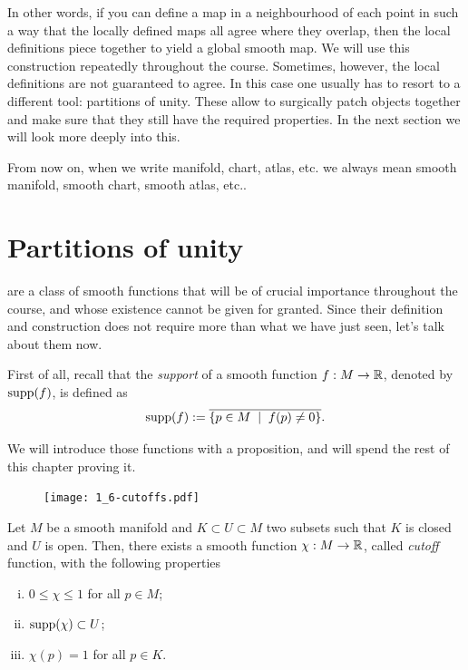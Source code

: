 In other words, if you can define a map in a neighbourhood of each point in such a way that the locally defined maps all agree where they overlap, then the local definitions piece together to yield a global smooth map.
We will use this construction repeatedly throughout the course.
Sometimes, however, the local definitions are not guaranteed to agree. In this case one usually has to resort to a different tool: partitions of unity.
These allow to surgically patch objects together and make sure that they still have the required properties.
In the next section we will look more deeply into this.

\begin{tcolorbox}
From now on, when we write manifold, chart, atlas, etc. we always mean smooth manifold, smooth chart, smooth atlas, etc..
\end{tcolorbox}

\section{Partitions of unity}

 are a class of smooth functions that will be of crucial importance throughout the course, and whose existence cannot be given for granted.
Since their definition and construction does not require more than what we have just seen, let's talk about them now.

First of all, recall that the \emph{support} of a smooth function $f: M \to \mathbb{R}$, denoted by $\operatorname{supp}(f)$, is defined as
\begin{equation}
  \operatorname{supp}(f) := \overline{\{ p\in M \;\mid\; f(p) \neq 0\}}.
\end{equation}

We will introduce those functions with a proposition, and will spend the rest of this chapter proving it.

\begin{figure}[htp!]
  \texttt{[image: 1\_6-cutoffs.pdf]}
\end{figure}

\begin{proposition}\label{prop:cutoff}
  Let $M$ be a smooth manifold and $K\subset U\subset M$ two subsets such that $K$ is closed and $U$ is open.
  Then, there exists a smooth function $\chi: M \to\mathbb{R}$, called \emph{cutoff} function, with the following properties
  \begin{enumerate}[(i)]
    \item $0 \leq \chi \leq 1$ for all $p\in M$;
    \item $\operatorname{supp}(\chi)\subset U$;
    \item $\chi(p) = 1$ for all $p\in K$.
  \end{enumerate}
\end{proposition}

